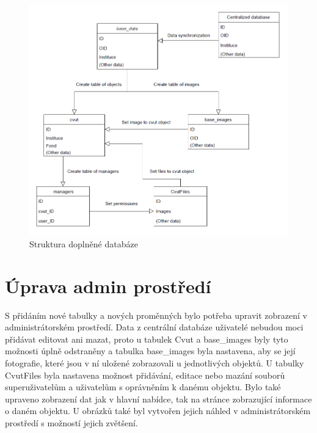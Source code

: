 \begin{figure}[H] \centering
    \includegraphics[width=400pt]{./pictures/23-db-diagram-2.PNG}
    \caption[Struktura doplněné databáze]{Struktura doplněné databáze}
	\label{fig:Struktura dopněné databáze}              
\end{figure}

\newpage

\section{Úprava admin prostředí}

S přidáním nové tabulky a nových proměnných bylo potřeba upravit
zobrazení v administrátorském prostředí. Data z centrální databáze
uživatelé nebudou moci přidávat editovat ani mazat, proto u tabulek
Cvut a base\_images byly tyto možnosti úplně odstraněny a tabulka
base\_images byla nastavena, aby se její fotografie, které jsou v ní
uložené zobrazovali u jednotlivých objektů. U tabulky CvutFiles byla
nastavena možnost přidávání, editace nebo mazání souborů
superuživatelům a uživatelům s oprávněním k danému objektu. Bylo také
upraveno zobrazení dat jak v hlavní nabídce, tak na stránce
zobrazující informace o daném objektu. U obrázků také byl vytvořen
jejich náhled v administrátorském prostředí s možností jejich
zvětšení.

